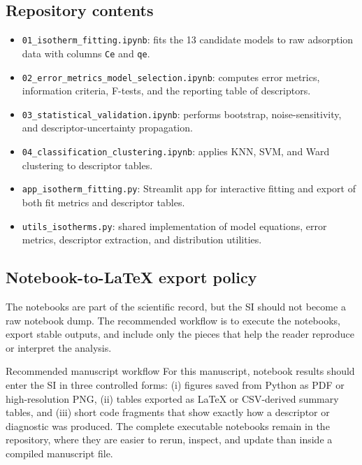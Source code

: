 \documentclass[journal=jacsat,manuscript=article]{achemso}
\begin{document}
\subsection{Repository contents}
\label{sec:si_notebook_contents}

\begin{itemize}
	\item \texttt{01\_isotherm\_fitting.ipynb}: fits the 13 candidate models to
	raw adsorption data with columns \texttt{Ce} and \texttt{qe}.
	\item \texttt{02\_error\_metrics\_model\_selection.ipynb}: computes error
	metrics, information criteria, F-tests, and the reporting table of
	descriptors.
	\item \texttt{03\_statistical\_validation.ipynb}: performs bootstrap,
	noise-sensitivity, and descriptor-uncertainty propagation.
	\item \texttt{04\_classification\_clustering.ipynb}: applies KNN, SVM, and
	Ward clustering to descriptor tables.
	\item \texttt{app\_isotherm\_fitting.py}: Streamlit app for interactive fitting
	and export of both fit metrics and descriptor tables.
	\item \texttt{utils\_isotherms.py}: shared implementation of model equations,
	error metrics, descriptor extraction, and distribution utilities.
\end{itemize}

\subsection{Notebook-to-LaTeX export policy}
\label{sec:si_notebook_latex_export}

The notebooks are part of the scientific record, but the SI should not become a
raw notebook dump. The recommended workflow is to execute the notebooks, export
stable outputs, and include only the pieces that help the reader reproduce or
interpret the analysis.

\begin{greenbox}{Recommended manuscript workflow}
	For this manuscript, notebook results should enter the SI in three controlled
	forms: (i) figures saved from Python as PDF or high-resolution PNG, (ii)
	tables exported as \LaTeX{} or CSV-derived summary tables, and (iii) short
	code fragments that show exactly how a descriptor or diagnostic was produced.
	The complete executable notebooks remain in the repository, where they are
	easier to rerun, inspect, and update than inside a compiled manuscript file.
\end{greenbox}
\end{document}
